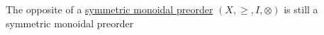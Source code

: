The opposite of a \hyperref[D2.2]{symmetric monoidal preorder} $(X, \geq, I, \otimes)$ is still a symmetric monoidal preorder